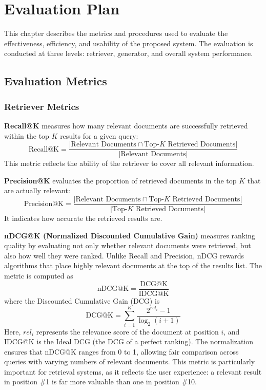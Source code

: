 \chapter{Evaluation Plan}

This chapter describes the metrics and procedures used to evaluate the effectiveness, efficiency, and usability of the proposed system. The evaluation is conducted at three levels: retriever, generator, and overall system performance.

\section{Evaluation Metrics}

\subsection{Retriever Metrics}

\textbf{Recall@K} measures how many relevant documents are successfully retrieved within the top $K$ results for a given query:
\[
\text{Recall@K} = 
\frac{\lvert \text{Relevant Documents} \cap \text{Top-}K \text{ Retrieved Documents} \rvert}
{\lvert \text{Relevant Documents} \rvert}
\]
This metric reflects the ability of the retriever to cover all relevant information.

\textbf{Precision@K} evaluates the proportion of retrieved documents in the top $K$ that are actually relevant:
\[
\text{Precision@K} =
\frac{\lvert \text{Relevant Documents} \cap \text{Top-}K \text{ Retrieved Documents} \rvert}
{\lvert \text{Top-}K \text{ Retrieved Documents} \rvert}
\]
It indicates how accurate the retrieved results are.

\textbf{nDCG@K (Normalized Discounted Cumulative Gain)} measures ranking quality by evaluating not only whether relevant documents were retrieved, but also how well they were ranked. Unlike Recall and Precision, nDCG rewards algorithms that place highly relevant documents at the top of the results list. The metric is computed as
\[
\text{nDCG@K} = \frac{\text{DCG@K}}{\text{IDCG@K}}
\]
where the Discounted Cumulative Gain (DCG) is
\[
\text{DCG@K} = \sum_{i=1}^{K} \frac{2^{rel_i} - 1}{\log_2(i+1)}
\]
Here, $rel_i$ represents the relevance score of the document at position $i$, and IDCG@K is the Ideal DCG (the DCG of a perfect ranking). The normalization ensures that nDCG@K ranges from 0 to 1, allowing fair comparison across queries with varying numbers of relevant documents. This metric is particularly important for retrieval systems, as it reflects the user experience: a relevant result in position \#1 is far more valuable than one in position \#10.

